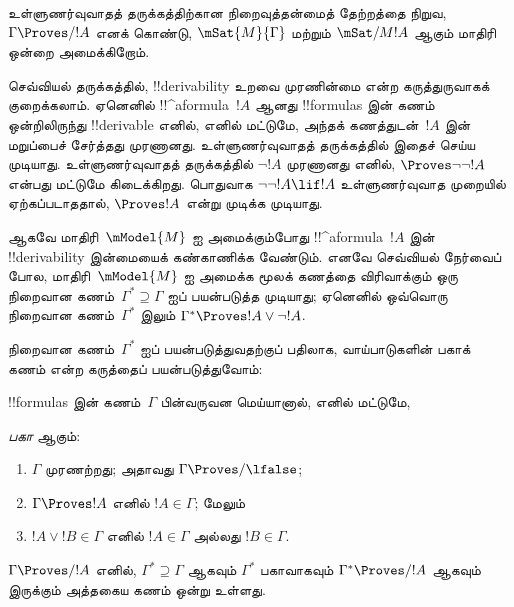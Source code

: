 \documentclass[../../../include/open-logic-section]{subfiles}
\begin{document}


உள்ளுணர்வுவாதத் தருக்கத்திற்கான நிறைவுத்தன்மைத் தேற்றத்தை நிறுவ,
$\Gamma \Proves/ !A$ எனக் கொண்டு, $\mSat{M}{\Gamma}$ மற்றும்
$\mSat/{M}{!A}$ ஆகும் மாதிரி ஒன்றை அமைக்கிறோம்.

செவ்வியல் தருக்கத்தில், !!{derivability} உறவை முரணின்மை என்ற கருத்துருவாகக்
குறைக்கலாம். ஏனெனில் !!^a{formula}~$!A$ ஆனது !!{formula}s இன் கணம்
ஒன்றிலிருந்து !!{derivable} எனில், எனில் மட்டுமே, அந்தக் கணத்துடன்~$!A$ இன்
மறுப்பைச் சேர்த்தது முரணானது. உள்ளுணர்வுவாதத் தருக்கத்தில் இதைச் செய்ய
முடியாது. உள்ளுணர்வுவாதத் தருக்கத்தில் $\lnot!A$ முரணானது எனில்,
$\Proves \lnot\lnot !A$ என்பது மட்டுமே கிடைக்கிறது. பொதுவாக
$\lnot\lnot!A \lif !A$ உள்ளுணர்வுவாத முறையில் ஏற்கப்படாததால்,
$\Proves !A$ என்று முடிக்க முடியாது.

ஆகவே மாதிரி~$\mModel{M}$ ஐ அமைக்கும்போது !!^a{formula}~$!A$ இன்
!!{derivability} இன்மையைக் கண்காணிக்க வேண்டும். எனவே செவ்வியல் நேர்வைப்
போல, மாதிரி~$\mModel{M}$ ஐ அமைக்க மூலக் கணத்தை விரிவாக்கும் ஒரு நிறைவான
கணம்~$\Gamma^* \supseteq \Gamma$ ஐப் பயன்படுத்த முடியாது; ஏனெனில்
ஒவ்வொரு நிறைவான கணம்~$\Gamma^*$ இலும்
$\Gamma^* \Proves !A \lor \lnot !A$.

நிறைவான கணம்~$\Gamma^*$ ஐப் பயன்படுத்துவதற்குப் பதிலாக, வாய்பாடுகளின்
பகாக் கணம் என்ற கருத்தைப் பயன்படுத்துவோம்:

\begin{defn}
  !!{formula}s இன் கணம்~$\Gamma$ பின்வருவன மெய்யானால், எனில் மட்டுமே,
  
  \emph{பகா} ஆகும்:
  \begin{enumerate}
  \item{} $\Gamma$ முரணற்றது; அதாவது
    $\Gamma \Proves/ \lfalse$;
  \item{} $\Gamma \Proves !A$ எனில்
    $!A \in \Gamma$; மேலும்
  \item{} $!A \lor !B \in \Gamma$ எனில்
    $!A \in \Gamma$ அல்லது $!B \in \Gamma$.
  \end{enumerate}
\end{defn}

\begin{lem}[லிண்டன்பாமின் துணைத்தேற்றம்]
   $\Gamma \Proves/ !A$ எனில்,
  $\Gamma^* \supseteq \Gamma$ ஆகவும் $\Gamma^*$ பகாவாகவும்
  $\Gamma^* \Proves/ !A$ ஆகவும் இருக்கும் அத்தகைய கணம் ஒன்று உள்ளது.
\end{lem}
\end{document}
